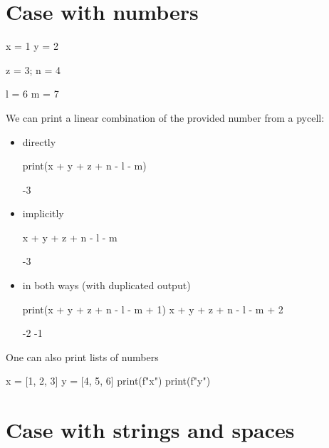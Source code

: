 \documentclass[oneside]{book}
\begin{document}
\chapter{Case with numbers}

\begin{pycell}
x = 1
y = 2
\end{pycell}

\begin{pycell}
z = 3; n = 4
\end{pycell}

\begin{pycell}
l = 6
m = 7
\end{pycell}


We can print a linear combination of the provided number from a pycell:

\begin{itemize}
\item directly
\begin{pycell}
print(x + y + z + n - l - m)
\end{pycell}
\begin{pyexpectedoutput}
-3
\end{pyexpectedoutput}
\item implicitly
\begin{pycell}
x + y + z + n - l - m
\end{pycell}
\begin{pyexpectedoutput}
-3
\end{pyexpectedoutput}
\item in both ways (with duplicated output)
\begin{pycell}
print(x + y + z + n - l - m + 1)
x + y + z + n - l - m + 2
\end{pycell}
\begin{pyexpectedoutput}
-2
-1
\end{pyexpectedoutput}
\end{itemize}

One can also print lists of numbers
\begin{pycell}
x = [1, 2, 3]
y = [4, 5, 6]
print(f"{x}")
print(f"{y}")
\end{pycell}
\begin{pyexpectedoutput}
[1, 2, 3]
[4, 5, 6]
\end{pyexpectedoutput}


\chapter{Case with strings and spaces}
\end{document}
